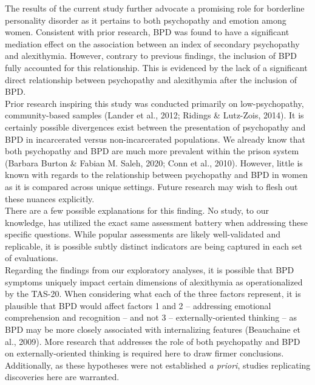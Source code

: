 \documentclass[
  man,floatsintext]{apa7}
\begin{document}
The results of the current study further advocate a promising role for borderline personality disorder as it pertains to both psychopathy and emotion among women. Consistent with prior research, BPD was found to have a significant mediation effect on the association between an index of secondary psychopathy and alexithymia. However, contrary to previous findings, the inclusion of BPD fully accounted for this relationship. This is evidenced by the lack of a significant direct relationship between psychopathy and alexithymia after the inclusion of BPD.\\
Prior research inspiring this study was conducted primarily on low-psychopathy, community-based samples (Lander et al., 2012; Ridings \& Lutz-Zois, 2014). It is certainly possible divergences exist between the presentation of psychopathy and BPD in incarcerated versus non-incarcerated populations. We already know that both psychopathy and BPD are much more prevalent within the prison system (Barbara Burton \& Fabian M. Saleh, 2020; Conn et al., 2010). However, little is known with regards to the relationship between psychopathy and BPD in women as it is compared across unique settings. Future research may wish to flesh out these nuances explicitly.\\
There are a few possible explanations for this finding. No study, to our knowledge, has utilized the exact same assessment battery when addressing these specific questions. While popular assessments are likely well-validated and replicable, it is possible subtly distinct indicators are being captured in each set of evaluations.\\
Regarding the findings from our exploratory analyses, it is possible that BPD symptoms uniquely impact certain dimensions of alexithymia as operationalized by the TAS-20. When considering what each of the three factors represent, it is plausible that BPD would affect factors 1 and 2 -- addressing emotional comprehension and recognition -- and not 3 -- externally-oriented thinking -- as BPD may be more closely associated with internalizing features (Beauchaine et al., 2009). More research that addresses the role of both psychopathy and BPD on externally-oriented thinking is required here to draw firmer conclusions. Additionally, as these hypotheses were not established \emph{a priori}, studies replicating discoveries here are warranted.\\
\end{document}
